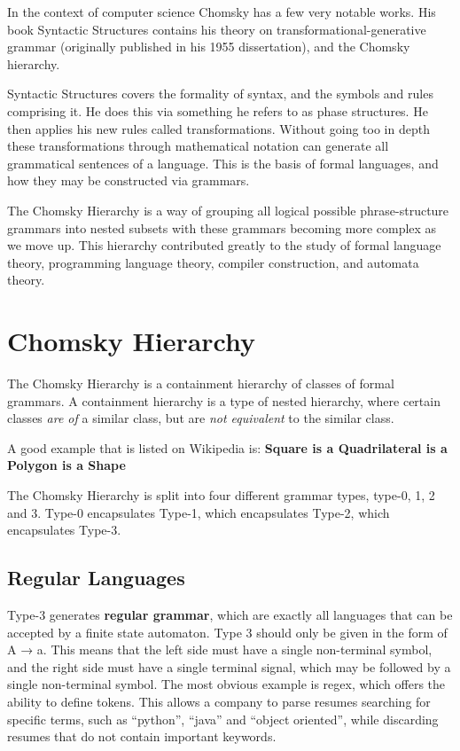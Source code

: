\documentclass{article}
\begin{document}
In the context of computer science Chomsky has a few very notable works. 
His book Syntactic Structures contains his theory on transformational-generative grammar (originally published in his 1955 dissertation), and the Chomsky hierarchy.
\medskip

Syntactic Structures covers the formality of syntax, and the symbols and rules comprising it. He does this via something he refers to as phase structures. 
He then applies his new rules called transformations. Without going too in depth these transformations through mathematical notation can generate all grammatical sentences of a language. 
This is the basis of formal languages, and how they may be constructed via grammars. 
\medskip

The Chomsky Hierarchy is a way of grouping all logical possible phrase-structure grammars into nested subsets with these grammars becoming more complex as we move up. 
This hierarchy contributed greatly to the study of formal language theory, programming language theory, compiler construction, and automata theory.

\section{Chomsky Hierarchy}  

The Chomsky Hierarchy is a containment hierarchy of classes of formal grammars.
A containment hierarchy is a type of nested hierarchy, where certain classes \textit{are of} a similar class, but are \textit{not equivalent} to the similar class.

A good example that is listed on Wikipedia is:
\textbf{Square is a Quadrilateral is a Polygon is a Shape}

The Chomsky Hierarchy is split into four different grammar types, type-0, 1, 2 and 3.
Type-0 encapsulates Type-1, which encapsulates Type-2, which encapsulates Type-3.

\subsection{Regular Languages} 

Type-3 generates \textbf{regular grammar}, which are exactly all languages that can be accepted by a finite state automaton. Type 3 should only be given in the form of A → a. 
This means that the left side must have a single non-terminal symbol, and the right side must have a single terminal signal, which may be followed by a single non-terminal symbol. 
The most obvious example is regex, which offers the ability to define tokens. This allows a company to parse resumes searching for specific terms, such as “python”, “java” and 
``object oriented”, while discarding resumes that do not contain important keywords.
\end{document}
